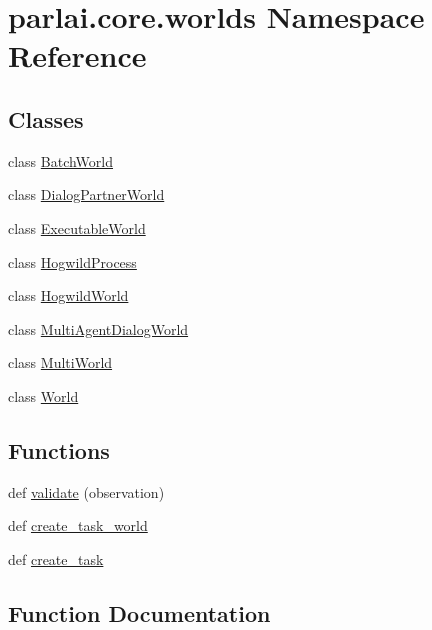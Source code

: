 \hypertarget{namespaceparlai_1_1core_1_1worlds}{}\section{parlai.\+core.\+worlds Namespace Reference}
\label{namespaceparlai_1_1core_1_1worlds}
\subsection*{Classes}
\begin{DoxyCompactItemize}
\item 
class \hyperlink{classparlai_1_1core_1_1worlds_1_1BatchWorld}{Batch\+World}
\item 
class \hyperlink{classparlai_1_1core_1_1worlds_1_1DialogPartnerWorld}{Dialog\+Partner\+World}
\item 
class \hyperlink{classparlai_1_1core_1_1worlds_1_1ExecutableWorld}{Executable\+World}
\item 
class \hyperlink{classparlai_1_1core_1_1worlds_1_1HogwildProcess}{Hogwild\+Process}
\item 
class \hyperlink{classparlai_1_1core_1_1worlds_1_1HogwildWorld}{Hogwild\+World}
\item 
class \hyperlink{classparlai_1_1core_1_1worlds_1_1MultiAgentDialogWorld}{Multi\+Agent\+Dialog\+World}
\item 
class \hyperlink{classparlai_1_1core_1_1worlds_1_1MultiWorld}{Multi\+World}
\item 
class \hyperlink{classparlai_1_1core_1_1worlds_1_1World}{World}
\end{DoxyCompactItemize}
\subsection*{Functions}
\begin{DoxyCompactItemize}
\item 
def \hyperlink{namespaceparlai_1_1core_1_1worlds_afc3fad603b7bce41dbdc9cdc04a9c794}{validate} (observation)
\item 
def \hyperlink{namespaceparlai_1_1core_1_1worlds_ae4ed098adcaad6ec7563e665485ccdcf}{create\+\_\+task\+\_\+world}
\item 
def \hyperlink{namespaceparlai_1_1core_1_1worlds_a79969c7ba76d4b3c500f5bb776444dc6}{create\+\_\+task}
\end{DoxyCompactItemize}


\subsection{Function Documentation}
\mbox{\label{namespaceparlai_1_1core_1_1worlds_a79969c7ba76d4b3c500f5bb776444dc6}} 
